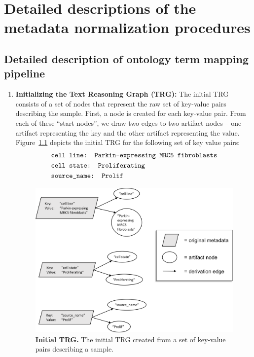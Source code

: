 \chapter{Detailed descriptions of the metadata normalization procedures }\label{app:1}

\section{Detailed description of ontology term mapping pipeline } \label{sec:mapping_pipeline}

\begin{enumerate}
\item \textbf{Initializing the Text Reasoning Graph (TRG):} The initial TRG consists of a set of nodes that represent the raw set of key-value pairs describing the sample.  First, a node is created for each key-value pair.  From each of these ``start nodes'', we draw two edges to two artifact nodes -- one artifact representing the key and the other artifact representing the value.  Figure~\ref{fig:init_trg} depicts the initial TRG for the following set of key value pairs:
\begin{align*}
    &\text{\texttt{cell line: Parkin-expressing MRC5 fibroblasts}}\\
    &\text{\texttt{cell state: Proliferating}}\\
    &\text{\texttt{source\_name: Prolif}}
\end{align*}

\begin{figure}[htbp]
\centering
\includegraphics[width=13cm]{figures/init_trg.png}  
\caption{\textbf{Initial TRG.} The initial TRG created from a set of key-value pairs describing a sample.}
\label{fig:init_trg}
\end{figure}


\end{enumerate}
